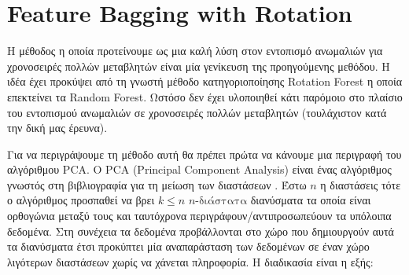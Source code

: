 \documentclass[a4paper,12pt]{report}
\theoremstyle{definitionNODot}
\begin{document}
	\section{Feature Bagging with Rotation}
	Η μέθοδος η οποία προτείνουμε ως μια καλή λύση στον εντοπισμό ανωμαλιών για χρονοσειρές πολλών μεταβλητών είναι μία γενίκευση της προηγούμενης μεθόδου. Η ιδέα έχει προκύψει από τη γνωστή μέθοδο κατηγοριοποίησης Rotation Forest \cite{Rotation2006Forest} η οποία επεκτείνει τα Random Forest. Ωστόσο δεν έχει υλοποιηθεί κάτι παρόμοιο στο πλαίσιο του εντοπισμού ανωμαλιών σε χρονοσειρές πολλών μεταβλητών (τουλάχιστον κατά την δική μας έρευνα).
	
	Για να περιγράψουμε τη μέθοδο αυτή θα πρέπει πρώτα να κάνουμε μια περιγραφή του αλγόριθμου PCA. Ο PCA (Principal Component Analysis) είναι ένας αλγόριθμος γνωστός στη βιβλιογραφία για τη μείωση των διαστάσεων \cite{han2012mining}. Έστω $n$ η διαστάσεις τότε ο αλγόριθμος προσπαθεί να βρει $k\leq n$ $n\text{-διάστατα}$ διανύσματα τα οποία είναι ορθογώνια μεταξύ τους και ταυτόχρονα περιγράφουν/αντιπροσωπεύουν τα υπόλοιπα δεδομένα. Στη συνέχεια τα δεδομένα προβάλλονται στο χώρο που δημιουργούν αυτά τα διανύσματα έτσι προκύπτει μία αναπαράσταση των δεδομένων σε έναν χώρο λιγότερων διαστάσεων χωρίς να χάνεται πληροφορία. Η διαδικασία είναι η εξής:
	
\end{document}
